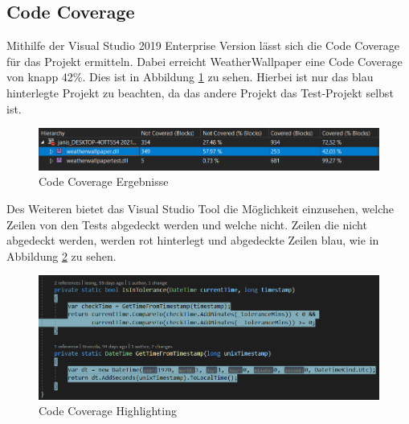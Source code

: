 \subsection{Code Coverage}
Mithilfe der Visual Studio 2019 Enterprise Version lässt sich die Code Coverage für das Projekt ermitteln. Dabei erreicht WeatherWallpaper eine Code Coverage von knapp 42\%. Dies ist in Abbildung \ref{CodeCoverage} zu sehen. Hierbei ist nur das blau hinterlegte Projekt zu beachten, da das andere Projekt das Test-Projekt selbst ist. 
\begin{figure}[ht]
\centering
\includegraphics[width=\textwidth]{Bilder/CodeCoverage}
\caption[Code Coverage Ergebnisse]{\label{CodeCoverage} Code Coverage Ergebnisse}
\end{figure}
Des Weiteren bietet das Visual Studio Tool die Möglichkeit einzusehen, welche Zeilen von den Tests abgedeckt werden und welche nicht. Zeilen die nicht abgedeckt werden, werden rot hinterlegt und abgedeckte Zeilen blau, wie in Abbildung \ref{CodeCoverageHighlight} zu sehen.
\begin{figure}[ht]
\centering
\includegraphics[width=\textwidth]{Bilder/CodeCoverageHighlighted}
\caption[Code Coverage Ergebnisse]{\label{CodeCoverageHighlight} Code Coverage Highlighting}
\end{figure}